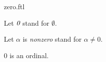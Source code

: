 \documentclass{naproche-library}
\begin{document}
\begin{smodule}[title=The number $0$]{zero.ftl}

\begin{convention}[forthel]
  Let $\emph{0}$ stand for $\emptyset$.

  Let $\alpha$ is \emph{nonzero} stand for $\alpha \neq 0$.
\end{convention}

\begin{proposition}[forthel,id=SET_THEORY_02_8483196888940544]
  $0$ is an ordinal.
\end{proposition}
\end{smodule}
\end{document}
